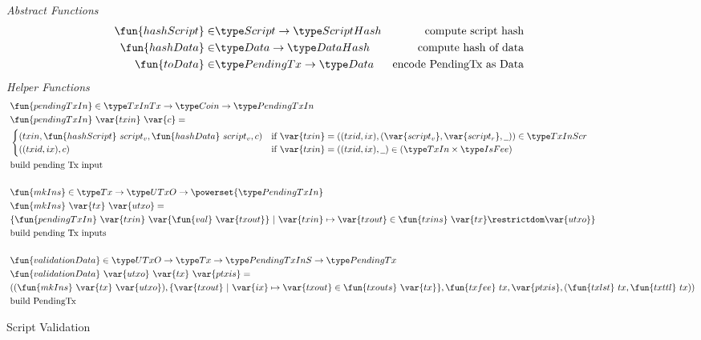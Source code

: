 %
\begin{figure*}[htb]
  \emph{Abstract Functions}
  \begin{align*}
    \fun{hashScript} \in & \Script\to \HashScr & \text{compute script hash} \\
    \fun{hashData} \in & \Data \to \HashDat
    & \text{compute hash of data} \\
    \fun{toData} \in & \PendingTx\to \Data
    & \text{encode PendingTx as Data} \\
  \end{align*}
  \emph{Helper Functions}
  \begin{align*}
    & \fun{pendingTxIn} \in \TxInTx \to \Coin \to \PendingTxIn \\
    & \fun{pendingTxIn}~\var{txin}~\var{c} = \\
    & \begin{cases}
          (txin,\fun{hashScript}~{script_v},\fun{hashData}~{script_v},c)
           & \text{if}~\var{txin} = ((txid,ix),(\var{script_v}, \var{script_r},\wcard)) \in \TxInScr \\
          ((txid,ix),c) & \text{if}~
           \var{txin} = ((txid,ix),\wcard) \in (\TxIn \times \IsFee)
      \end{cases}\\
    & \text{build pending Tx input} \\~\\
    & \fun{mkIns} \in \Tx \to \UTxO \to \powerset{\PendingTxIn} \\
    & \fun{mkIns}~\var{tx}~\var{utxo} = \\
    & \{ \fun{pendingTxIn}~\var{txin}~\var{\fun{val}~\var{txout}} ~\vert~ \var{txin} \mapsto \var{txout}
    \in \fun{txins}~\var{tx} \restrictdom \var{utxo}\} \\
    & \text{build pending Tx inputs} \\~\\
    & \fun{validationData} \in \UTxO \to \Tx \to \PendingTxInS \to \PendingTx \\
    & \fun{validationData}~\var{utxo}~\var{tx}~\var{ptxis} = \\ &
    ((\fun{mkIns}~\var{tx}~\var{utxo}),\{ \var{txout}~\vert~ \var{ix} \mapsto \var{txout} \in \fun{txouts}~\var{tx}\},
    \fun{txfee}~{tx},\var{ptxis},(\fun{txlst}~{tx},\fun{txttl}~{tx})) \\
    & \text{build PendingTx} \\
  \end{align*}
  \caption{Script Validation}
  \label{fig:defs:functions-helper}
\end{figure*}

